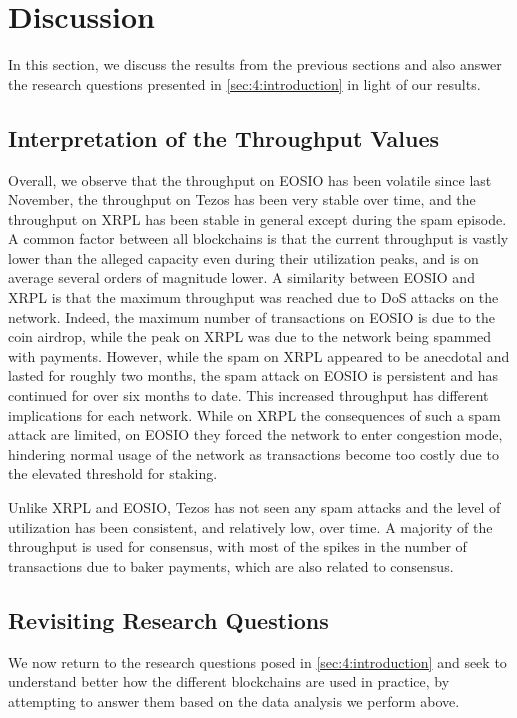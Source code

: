 \section{Discussion}
\label{sec:4:discussion}
In this section, we discuss the results from the previous sections and also answer the research questions presented in \autoref{sec:4:introduction} in light of our results.


\subsection{Interpretation of the Throughput Values}
Overall, we observe that the throughput on EOSIO has been volatile since last November, the throughput on Tezos has been very stable over time, and the throughput on XRPL has been stable in general except during the spam episode.
A common factor between all blockchains is that the current throughput is vastly lower than the alleged capacity even during their utilization peaks, and is on average several orders of magnitude lower.
A similarity between EOSIO and XRPL is that the maximum throughput was reached due to DoS attacks on the network. Indeed, the maximum number of transactions on EOSIO is due to the  coin airdrop, while the peak on XRPL was due to the network being spammed with payments.
However, while the spam on XRPL appeared to be anecdotal and lasted for roughly two months, the spam attack on EOSIO is persistent and has continued for over six months to date.
This increased throughput has different implications for each network.
While on XRPL the consequences of such a spam attack are limited, on EOSIO they forced the network to enter congestion mode, hindering normal usage of the network as transactions become too costly due to the elevated threshold for staking.

Unlike XRPL and EOSIO, Tezos has not seen any spam attacks and the level of utilization has been consistent, and relatively low, over time. A majority of the throughput is used for consensus, with most of the spikes in the number of transactions due to baker payments, which are also related to consensus.

\subsection{Revisiting Research Questions}
We now return to the research questions posed in \autoref{sec:4:introduction} and seek to understand better how the different blockchains are used in practice, by attempting to answer them based on the data analysis we perform above.

